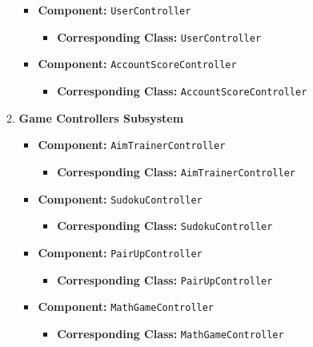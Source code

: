 \documentclass[11pt,a4paper]{article}
\begin{document}
\begin{enumerate}[label=\textbf{\arabic*.}, ref=\arabic*]
\begin{enumerate}[label=\textbf{\alph*.}, ref=\theenumi.\alph*]
                \begin{itemize}
                    \item \textbf{Component:} \texttt{UserController}
                        \begin{itemize}
                            \item \textbf{Corresponding Class:} \texttt{UserController}
                        \end{itemize}
                    \item \textbf{Component:} \texttt{AccountScoreController}
                        \begin{itemize}
                            \item \textbf{Corresponding Class:} \texttt{AccountScoreController}
                        \end{itemize}
                \end{itemize}
            \item \textbf{Game Controllers Subsystem}
                \begin{itemize}
                    \item \textbf{Component:} \texttt{AimTrainerController}
                        \begin{itemize}
                            \item \textbf{Corresponding Class:} \texttt{AimTrainerController}
                        \end{itemize}
                    \item \textbf{Component:} \texttt{SudokuController}
                        \begin{itemize}
                            \item \textbf{Corresponding Class:} \texttt{SudokuController}
                        \end{itemize}
                    \item \textbf{Component:} \texttt{PairUpController}
                        \begin{itemize}
                            \item \textbf{Corresponding Class:} \texttt{PairUpController}
                        \end{itemize}
                    \item \textbf{Component:} \texttt{MathGameController}
                        \begin{itemize}
                            \item \textbf{Corresponding Class:} \texttt{MathGameController}

\end{itemize}
\end{itemize}
\end{enumerate}
\end{enumerate}
\end{document}
